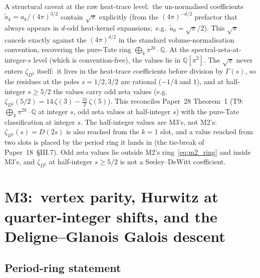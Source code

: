 \documentclass[11pt,a4paper]{article}
\theoremstyle{plain}
\theoremstyle{definition}
\newcommand{\Q}{\mathbb{Q}}
\begin{document}
A structural caveat at the raw heat-trace level:\ the un-normalised
coefficients $\tilde a_k = a_k / (4\pi)^{3/2}$ contain $\sqrt\pi$
explicitly (from the $(4\pi)^{-d/2}$ prefactor that always appears
in $d$-odd heat-kernel expansions;\ e.g.\ $\tilde a_0 = \sqrt\pi/2$).  This $\sqrt\pi$
cancels exactly against the $(4\pi)^{d/2}$ in the standard
volume-normalisation convention, recovering the pure-Tate ring
$\bigoplus_k \pi^{2k}\cdot\Q$.  At the spectral-zeta-at-integer-$s$
level (which is convention-free), the values lie in
$\Q[\pi^2]$.  The $\sqrt\pi$ never enters $\zeta_{D^2}$ itself:\ it
lives in the heat-trace coefficients before division by $\Gamma(s)$,
so the residues at the poles $s = 1/2, 3/2$ are rational ($-1/4$ and
$1$), and at half-integer $s \ge 5/2$ the values carry odd zeta
values (e.g.\ $\zeta_{D^2}(5/2) = 14\,\zeta(3) - \tfrac{31}{2}\,\zeta(5)$).
This reconciles Paper~28 Theorem~1 (T9:\ $\bigoplus_k \pi^{2k}\cdot\Q$
at integer $s$, odd zeta values at half-integer $s$) with the
pure-Tate classification at integer $s$.  The half-integer values are
M3's, not M2's:\ $\zeta_{D^2}(s) = D(2s)$ is also reached from the
$k = 1$ slot, and a value reached from two slots is placed by the
period ring it lands in (the tie-break of Paper~18~\S III.7).  Odd zeta
values lie outside M2's ring~\eqref{eq:m2_ring} and inside M3's, and
$\zeta_{D^2}$ at half-integer $s \ge 5/2$ is not a Seeley--DeWitt
coefficient.

\section{M3:\ vertex parity, Hurwitz at quarter-integer shifts, and
the Deligne--Glanois Galois descent}
\label{sec:m3}

\subsection{Period-ring statement}
\end{document}

